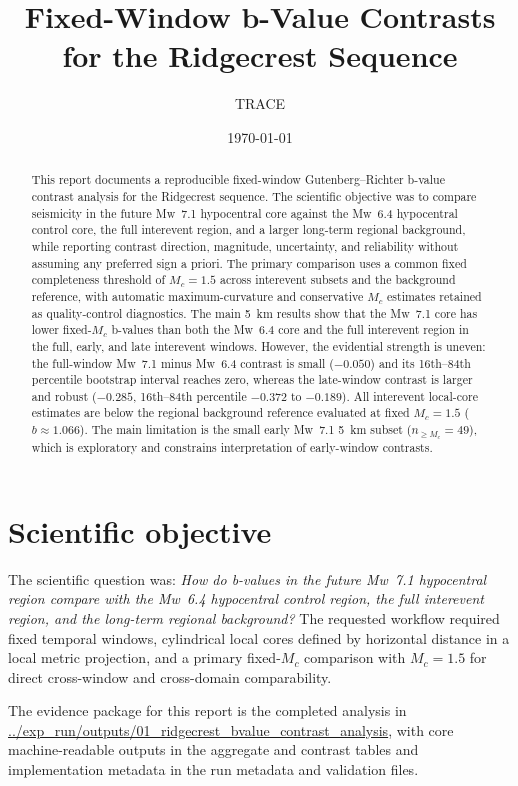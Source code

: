\documentclass[11pt]{article}
\title{Fixed-Window b-Value Contrasts for the Ridgecrest Sequence}
\author{TRACE}
\date{\today}
\begin{document}
\maketitle

\begin{abstract}
This report documents a reproducible fixed-window Gutenberg--Richter b-value contrast analysis for the Ridgecrest sequence. The scientific objective was to compare seismicity in the future Mw~7.1 hypocentral core against the Mw~6.4 hypocentral control core, the full interevent region, and a larger long-term regional background, while reporting contrast direction, magnitude, uncertainty, and reliability without assuming any preferred sign a priori. The primary comparison uses a common fixed completeness threshold of $M_c=1.5$ across interevent subsets and the background reference, with automatic maximum-curvature and conservative $M_c$ estimates retained as quality-control diagnostics. The main 5~km results show that the Mw~7.1 core has lower fixed-$M_c$ b-values than both the Mw~6.4 core and the full interevent region in the full, early, and late interevent windows. However, the evidential strength is uneven: the full-window Mw~7.1 minus Mw~6.4 contrast is small ($-0.050$) and its 16th--84th percentile bootstrap interval reaches zero, whereas the late-window contrast is larger and robust ($-0.285$, 16th--84th percentile $-0.372$ to $-0.189$). All interevent local-core estimates are below the regional background reference evaluated at fixed $M_c=1.5$ ($b\approx 1.066$). The main limitation is the small early Mw~7.1 5~km subset ($n_{\ge M_c}=49$), which is exploratory and constrains interpretation of early-window contrasts.
\end{abstract}

\section{Scientific objective}
The scientific question was: \emph{How do b-values in the future Mw~7.1 hypocentral region compare with the Mw~6.4 hypocentral control region, the full interevent region, and the long-term regional background?} The requested workflow required fixed temporal windows, cylindrical local cores defined by horizontal distance in a local metric projection, and a primary fixed-$M_c$ comparison with $M_c=1.5$ for direct cross-window and cross-domain comparability.

The evidence package for this report is the completed analysis in
\url{../exp_run/outputs/01_ridgecrest_bvalue_contrast_analysis},
with core machine-readable outputs in the aggregate and contrast tables and implementation metadata in the run metadata and validation files.
\end{document}
